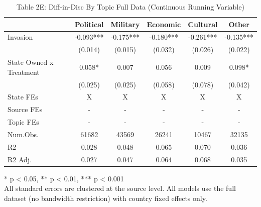 \begin{table}[!t]
\caption{Table 2E: Diff-in-Disc By Topic Full Data (Continuous Running Variable)} 
\fontsize{12.0pt}{14.4pt}\selectfont
\begin{tabular*}{\linewidth}{@{\extracolsep{\fill}}lccccc}
\toprule
  & Political & Military & Economic & Cultural & Other \\ 
\midrule\addlinespace[2.5pt]
Invasion & -0.093*** & -0.175*** & -0.180*** & -0.261*** & -0.135*** \\ 
 & (0.014) & (0.015) & (0.032) & (0.026) & (0.022) \\ 
State Owned x Treatment & 0.058* & 0.007 & 0.056 & 0.009 & 0.098* \\ 
{} & {(0.025)} & {(0.025)} & {(0.058)} & {(0.078)} & {(0.042)} \\ 
State FEs & X & X & X & X & X \\ 
Source FEs & - & - & - & - & - \\ 
Topic FEs & - & - & - & - & - \\ 
Num.Obs. & 61682 & 43569 & 26241 & 10467 & 32135 \\ 
R2 & 0.028 & 0.048 & 0.065 & 0.070 & 0.036 \\ 
R2 Adj. & 0.027 & 0.047 & 0.064 & 0.068 & 0.035 \\ 
\bottomrule
\end{tabular*}
\begin{minipage}{\linewidth}
* p < 0.05, ** p < 0.01, *** p < 0.001\\
All standard errors are clustered at the source level. All models use the full
dataset (no bandwidth restriction) with country fixed effects only.\\
\end{minipage}
\end{table}

